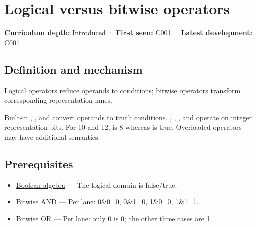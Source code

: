 \hypertarget{appendix-fe6b457d68d8}{}\label{referencestart:appendix-fe6b457d68d8}
\section{Logical versus bitwise operators}\label{appendix-fe6b457d68d8-logical-versus-bitwise-operators}

\hypertarget{appendix-fe6b457d68d8-logical-versus-bitwise-operators}{}

\textbf{Curriculum depth:} Introduced · \textbf{First seen:} C001 · \textbf{Latest development:} C001

\begin{allmightroledefinition}

\subsection{Definition and mechanism}\label{appendix-fe6b457d68d8-definition-and-mechanism}

\hypertarget{appendix-fe6b457d68d8-definition-and-mechanism}{}

Logical operators reduce operands to conditions; bitwise operators transform corresponding representation lanes.

\end{allmightroledefinition}

Built-in \BookInlineCode{{\&}{\&}}{\&\&}, \BookInlineCode{{\textbar{}}{\textbar{}}}{\textbar{}\textbar{}}, and \BookInlineCode{{!}}{!} convert operands to truth conditions. \BookInlineCode{{\&}}{\&}, \BookInlineCode{{\textbar{}}}{\textbar{}}, \BookInlineCode{{\^{}}}{\^{}}, and \BookInlineCode{{\textasciitilde{}}}{\textasciitilde{}} operate on integer representation bits. For 10 and 12,  is 8 whereas  is true. Overloaded operators may have additional semantics.

\subsection{Prerequisites}\label{appendix-fe6b457d68d8-prerequisites}

\hypertarget{appendix-fe6b457d68d8-prerequisites}{}

\begin{itemize}
\tightlist
\item
  \hyperref[appendix-24475e1596a8]{Boolean algebra} --- The logical domain is false/true.
\item
  \hyperref[appendix-68b52453737c]{Bitwise AND} --- Per lane: 0\&0=0, 0\&1=0, 1\&0=0, 1\&1=1.
\item
  \hyperref[appendix-a427ce8ce8a6]{Bitwise OR} --- Per lane: only 0 is 0; the other three cases are 1.
\end{itemize}

